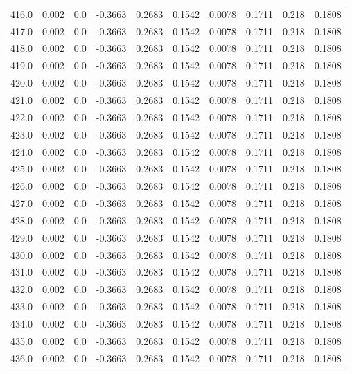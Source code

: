 \begin{longtable}{lrrrrrrrrr}
416.0 & 0.002 & 0.0 & -0.3663 & 0.2683 & 0.1542 & 0.0078 & 0.1711 & 0.218 & 0.1808 \\
417.0 & 0.002 & 0.0 & -0.3663 & 0.2683 & 0.1542 & 0.0078 & 0.1711 & 0.218 & 0.1808 \\
418.0 & 0.002 & 0.0 & -0.3663 & 0.2683 & 0.1542 & 0.0078 & 0.1711 & 0.218 & 0.1808 \\
419.0 & 0.002 & 0.0 & -0.3663 & 0.2683 & 0.1542 & 0.0078 & 0.1711 & 0.218 & 0.1808 \\
420.0 & 0.002 & 0.0 & -0.3663 & 0.2683 & 0.1542 & 0.0078 & 0.1711 & 0.218 & 0.1808 \\
421.0 & 0.002 & 0.0 & -0.3663 & 0.2683 & 0.1542 & 0.0078 & 0.1711 & 0.218 & 0.1808 \\
422.0 & 0.002 & 0.0 & -0.3663 & 0.2683 & 0.1542 & 0.0078 & 0.1711 & 0.218 & 0.1808 \\
423.0 & 0.002 & 0.0 & -0.3663 & 0.2683 & 0.1542 & 0.0078 & 0.1711 & 0.218 & 0.1808 \\
424.0 & 0.002 & 0.0 & -0.3663 & 0.2683 & 0.1542 & 0.0078 & 0.1711 & 0.218 & 0.1808 \\
425.0 & 0.002 & 0.0 & -0.3663 & 0.2683 & 0.1542 & 0.0078 & 0.1711 & 0.218 & 0.1808 \\
426.0 & 0.002 & 0.0 & -0.3663 & 0.2683 & 0.1542 & 0.0078 & 0.1711 & 0.218 & 0.1808 \\
427.0 & 0.002 & 0.0 & -0.3663 & 0.2683 & 0.1542 & 0.0078 & 0.1711 & 0.218 & 0.1808 \\
428.0 & 0.002 & 0.0 & -0.3663 & 0.2683 & 0.1542 & 0.0078 & 0.1711 & 0.218 & 0.1808 \\
429.0 & 0.002 & 0.0 & -0.3663 & 0.2683 & 0.1542 & 0.0078 & 0.1711 & 0.218 & 0.1808 \\
430.0 & 0.002 & 0.0 & -0.3663 & 0.2683 & 0.1542 & 0.0078 & 0.1711 & 0.218 & 0.1808 \\
431.0 & 0.002 & 0.0 & -0.3663 & 0.2683 & 0.1542 & 0.0078 & 0.1711 & 0.218 & 0.1808 \\
432.0 & 0.002 & 0.0 & -0.3663 & 0.2683 & 0.1542 & 0.0078 & 0.1711 & 0.218 & 0.1808 \\
433.0 & 0.002 & 0.0 & -0.3663 & 0.2683 & 0.1542 & 0.0078 & 0.1711 & 0.218 & 0.1808 \\
434.0 & 0.002 & 0.0 & -0.3663 & 0.2683 & 0.1542 & 0.0078 & 0.1711 & 0.218 & 0.1808 \\
435.0 & 0.002 & 0.0 & -0.3663 & 0.2683 & 0.1542 & 0.0078 & 0.1711 & 0.218 & 0.1808 \\
436.0 & 0.002 & 0.0 & -0.3663 & 0.2683 & 0.1542 & 0.0078 & 0.1711 & 0.218 & 0.1808 \\

\end{longtable}

